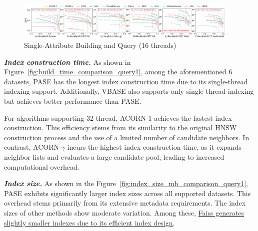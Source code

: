 \documentclass[sigconf, nonacm]{acmart}
\begin{document}
	\begin{figure}
		\centering
		
		\includegraphics[width=0.95\textwidth]{figures/exp/exp_1_2_SingleLabel_16thread.pdf}
		\caption{Single-Attribute Building and Query (16 threads)}
		\label{fig:exp_1_2_SingleLabel_16thread}
	\end{figure}
	
	\textit{\textbf{Index construction time.}}
	As shown in Figure~\ref{fig:build_time_comparison_query1}, among the aforementioned 6 datasets, PASE has the longest index construction time due to its single-thread indexing support. Additionally, VBASE also supports only single-thread indexing but achieves better performance than PASE.
	
	For algorithms supporting 32-thread, ACORN-1 achieves the fastest index construction. This efficiency stems from its similarity to the original HNSW construction process and the use of a limited number of candidate neighbors. In contrast, ACORN-$\gamma$ incurs the highest index construction time, as it expands neighbor lists and evaluates a large candidate pool, leading to increased computational overhead.
	
	
	\textit{\textbf{Index size.}}
	As shown in the Figure~\ref{fig:index_size_mb_comparison_query1}, PASE exhibits significantly larger index sizes across all supported datasets. This overhead stems primarily from its extensive metadata requirements. The index sizes of other methods show moderate variation. Among these, \underline{Faiss generates slightly smaller indexes due to its efficient index design}.
	
\end{document}
